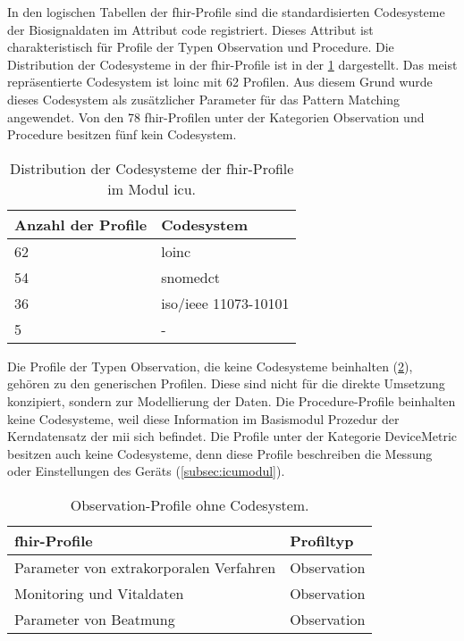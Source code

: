In den logischen Tabellen der \ac{fhir}-Profile sind die standardisierten Codesysteme der Biosignaldaten im Attribut \glqq code\grqq{} registriert. Dieses Attribut ist charakteristisch für Profile der Typen \glqq Observation\grqq{} und \glqq Procedure\grqq{}. Die Distribution der Codesysteme in der \ac{fhir}-Profile ist in der \ref{tab:profilcodes} dargestellt. Das meist repräsentierte Codesystem ist \ac{loinc} mit 62 Profilen. Aus diesem Grund wurde dieses Codesystem als zusätzlicher Parameter für das Pattern Matching angewendet. Von den 78 \ac{fhir}-Profilen unter der Kategorien \glqq Observation\grqq{} und \glqq Procedure\grqq{} besitzen fünf kein Codesystem.


\begin{table}[ht]
	\centering 
	\caption[Codesysteme der \acs{fhir}-Profile im Modul \glqq\acs{icu}\grqq{}]{Distribution der Codesysteme der \acs{fhir}-Profile im Modul \glqq\acs{icu}\grqq{}.}
	\label{tab:profilcodes}
	\begin{tabular}{|l|l|}
		\hline
		\bfseries Anzahl der Profile & \bfseries Codesystem \\ \hline		
		62 & \ac{loinc} \\ \hline
		54 & \ac{snomedct} \\ \hline   
		36 & \acs{iso}/\acs{ieee} 11073-10101\texttrademark{} \\ \hline
		5 & - \\ \hline
	\end{tabular}
\end{table}

Die Profile der Typen \glqq Observation\grqq{}, die keine Codesysteme beinhalten (\ref{tab:profilnocode}), gehören zu den generischen Profilen. Diese sind nicht für die direkte Umsetzung konzipiert, sondern zur Modellierung der Daten. Die \glqq Procedure\grqq{}-Profile beinhalten keine Codesysteme, weil diese Information im Basismodul \glqq Prozedur\grqq{} der Kerndatensatz der \ac{mii} sich befindet. Die Profile unter der Kategorie \glqq DeviceMetric\grqq{} besitzen auch keine Codesysteme, denn diese Profile beschreiben die Messung oder Einstellungen des Geräts (\ref{subsec:icumodul}).

\begin{table}[ht]
	\centering  
	\caption[\glqq Observation\grqq{}-Profile ohne Codesystem]{\glqq Observation\grqq{}-Profile ohne Codesystem.}
	\label{tab:profilnocode}
	\begin{tabular}{|p{8.5cm}|l|}
		\hline 
		\bfseries \ac{fhir}-Profile & \bfseries Profiltyp \\ \hline
		Parameter von extrakorporalen Verfahren & Observation \\ \hline
		Monitoring und Vitaldaten  & Observation \\ \hline
		Parameter von Beatmung  & Observation \\ \hline
	\end{tabular}
\end{table}

